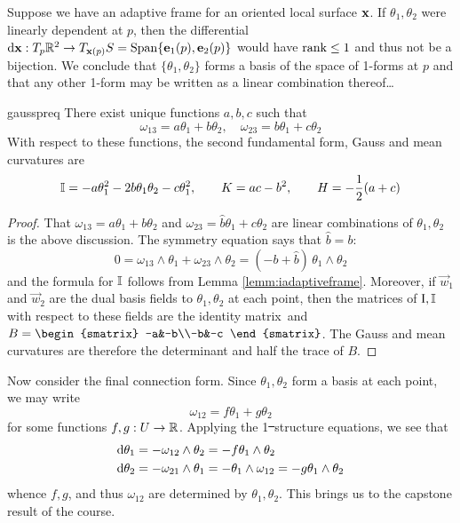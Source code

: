 
Suppose we have an adaptive frame for an oriented local surface ${\mathbf{x}}$. If $\theta_1,\theta_2$ were linearly dependent at $p$, then the differential $\mathrm{d}{\mathbf{x}}:T_p\mathbb{R}^2\to T_{{\mathbf{x}}(p)}S=\operatorname{Span}\{{\mathbf{e}}_1(p),{\mathbf{e}}_2(p)\}$ would have $\operatorname{rank}\le 1$ and thus not be a bijection. We conclude that $\{\theta_1,\theta_2\}$ forms a basis of the space of 1-forms at $p$ and that any other 1-form may be written as a linear combination thereof\ldots

\begin{lemm}{}{gausspreq}
There exist unique functions $a,b,c$ such that
\[\omega_{13}=a\theta_1+b\theta_2,\quad\omega_{23}=b\theta_1+c\theta_2\]
With respect to these functions, the second fundamental form, Gauss and mean curvatures are
\[\mathbb{I}=-a\theta_1^2-2b\theta_1\theta_2-c\theta_1^2,\qquad K=ac-b^2,\qquad H=-\frac 12(a+c)\]
\end{lemm}

\begin{proof}
That $\omega_{13}=a\theta_1+b\theta_2$ and $\omega_{23}=\hat b\theta_1+c\theta_2$ are linear combinations of $\theta_1,\theta_2$ is the above discussion. The symmetry equation says that $\hat b=b$:
\[0=\omega_{13}\wedge\theta_1+\omega_{23}\wedge\theta_2=(-b+\hat b)\,\theta_1\wedge\theta_2\]
and the formula for $\mathbb{I}$ follows from Lemma \ref{lemm:iadaptiveframe}.\smallbreak
Moreover, if $\vec w_1$ and $\vec w_2$ are the dual basis fields to $\theta_1,\theta_2$ at each point, then the matrices of $\mathrm{I},\mathbb{I}$ with respect to these fields are the identity matrix\footnotemark\ and $B=\begin{smatrix}
-a&-b\\-b&-c
\end{smatrix}$. The Gauss and mean curvatures are therefore the determinant and half the trace of $B$.
\end{proof}


Now consider the final connection form. Since $\theta_1,\theta_2$ form a basis at each point, we may write
\[\omega_{12}=f\theta_1+g\theta_2\]
for some functions $f,g:U\to\mathbb{R}$. Applying the 1\st\ structure equations, we see that 
\begin{align*}
&\mathrm{d}\theta_1=-\omega_{12}\wedge\theta_2=-f\theta_1\wedge\theta_2\\
&\mathrm{d}\theta_2=-\omega_{21}\wedge\theta_1=-\theta_1\wedge\omega_{12}=-g\theta_1\wedge\theta_2
\end{align*}
whence $f,g$, and thus $\omega_{12}$ are determined by $\theta_1,\theta_2$. This brings us to the capstone result of the course.

